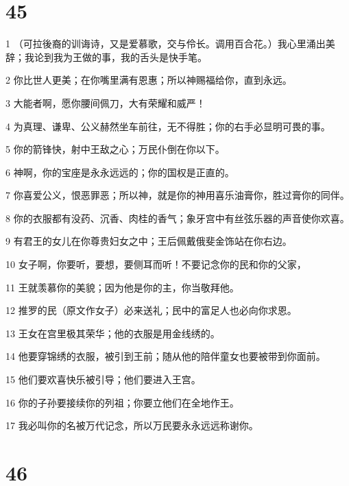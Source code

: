 \chapter{45}

\par 1 （可拉後裔的训诲诗，又是爱慕歌，交与伶长。调用百合花。）我心里涌出美辞；我论到我为王做的事，我的舌头是快手笔。
\par 2 你比世人更美；在你嘴里满有恩惠；所以神赐福给你，直到永远。
\par 3 大能者啊，愿你腰间佩刀，大有荣耀和威严！
\par 4 为真理、谦卑、公义赫然坐车前往，无不得胜；你的右手必显明可畏的事。
\par 5 你的箭锋快，射中王敌之心；万民仆倒在你以下。
\par 6 神啊，你的宝座是永永远远的；你的国权是正直的。
\par 7 你喜爱公义，恨恶罪恶；所以神，就是你的神用喜乐油膏你，胜过膏你的同伴。
\par 8 你的衣服都有没药、沉香、肉桂的香气；象牙宫中有丝弦乐器的声音使你欢喜。
\par 9 有君王的女儿在你尊贵妇女之中；王后佩戴俄斐金饰站在你右边。
\par 10 女子啊，你要听，要想，要侧耳而听！不要记念你的民和你的父家，
\par 11 王就羡慕你的美貌；因为他是你的主，你当敬拜他。
\par 12 推罗的民（原文作女子）必来送礼；民中的富足人也必向你求恩。
\par 13 王女在宫里极其荣华；他的衣服是用金线绣的。
\par 14 他要穿锦绣的衣服，被引到王前；随从他的陪伴童女也要被带到你面前。
\par 15 他们要欢喜快乐被引导；他们要进入王宫。
\par 16 你的子孙要接续你的列祖；你要立他们在全地作王。
\par 17 我必叫你的名被万代记念，所以万民要永永远远称谢你。

\chapter{46}

